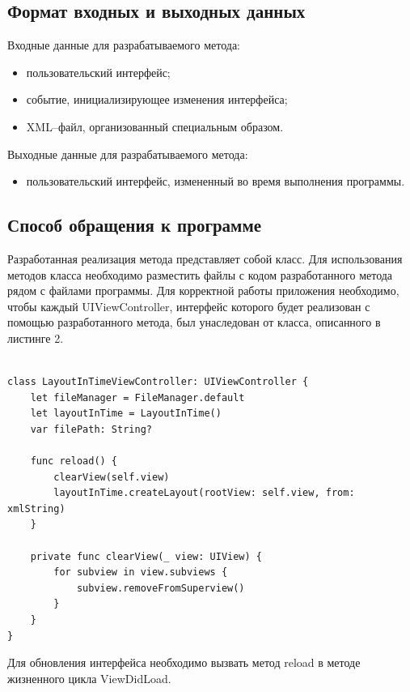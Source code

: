 \subsection{Формат входных и выходных данных}
Входные данные для разрабатываемого метода:

\begin{itemize}[label=---]
	\item пользовательский интерфейс;
	\item событие, инициализирующее изменения интерфейса;
	\item XML--файл, организованный специальным образом.
\end{itemize}

Выходные данные для разрабатываемого метода:

\begin{itemize}[label=---]
	\item пользовательский интерфейс, измененный во время выполнения программы.
\end{itemize}

\subsection{Способ обращения к программе}

Разработанная реализация метода представляет собой класс.
Для использования методов класса необходимо разместить файлы с кодом разработанного метода рядом с файлами программы. 
Для корректной работы приложения необходимо, чтобы каждый UIViewController, интерфейс которого будет реализован с помощью разработанного метода, был унаследован от класса, описанного в листинге 2. 

\begin{lstlisting}[caption={Класс, от которого наследуется UIViewController}]

class LayoutInTimeViewController: UIViewController {
    let fileManager = FileManager.default
    let layoutInTime = LayoutInTime()
    var filePath: String?

    func reload() {
        clearView(self.view)
        layoutInTime.createLayout(rootView: self.view, from: xmlString)
    }

    private func clearView(_ view: UIView) {
        for subview in view.subviews {
            subview.removeFromSuperview()
        }
    }
}
\end{lstlisting}

Для обновления интерфейса необходимо вызвать метод reload в методе жизненного цикла ViewDidLoad.

